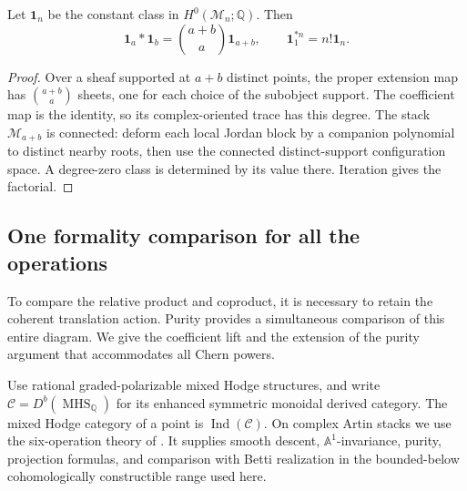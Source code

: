 \begin{proposition}\label{gh:constants}
Let $\mathbf1_n$ be the constant class in
$H^0(\mathcal M_n;\mathbb Q)$. Then
\[
 \mathbf1_a*\mathbf1_b=\binom{a+b}{a}\mathbf1_{a+b},
 \qquad \mathbf1_1^{*n}=n!\mathbf1_n .
\]
\end{proposition}
\begin{proof}
Over a sheaf supported at $a+b$ distinct points, the proper extension
map has $\binom{a+b}{a}$ sheets, one for each choice of the subobject
support. The coefficient map is the identity, so its complex-oriented
trace has this degree. The stack $\mathcal M_{a+b}$ is connected:
deform each local Jordan block by a companion polynomial to distinct
nearby roots, then use the connected distinct-support configuration
space. A degree-zero class is determined by its value there.
Iteration gives the factorial.
\end{proof}

\subsection{One formality comparison for all the operations}

To compare the relative product and coproduct, it is necessary to
retain the coherent translation action. Purity provides a simultaneous
comparison of this entire diagram. We give the coefficient lift and
the extension of the purity argument that accommodates all Chern
powers.

Use rational graded-polarizable mixed Hodge structures, and write
$\mathcal C=D^b(\operatorname{MHS}_{\mathbb Q})$ for its enhanced
symmetric monoidal derived category. The mixed Hodge category of a
point is $\operatorname{Ind}(\mathcal C)$. On complex Artin stacks
we use the six-operation theory of
\cite[Theorems 3.1, 3.8 and Proposition 3.16]{Tubach2025}.
It supplies smooth descent, $\mathbb A^1$-invariance, purity,
projection formulas, and comparison with Betti realization in the
bounded-below cohomologically constructible range used here.

